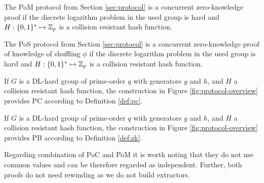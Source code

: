 \begin{lemma}\label{lem:pom2}
  The \ac{PoM} protocol from Section \ref{sec:protocol} is a concurrent zero-knowledge proof if the discrete logarithm problem in the used group \GG is hard and $H:\{0,1\}^\ast\mapsto\mathbb{Z}_p$ is a collision resistant hash function.
\end{lemma}

\begin{lemma}\label{lem:pos2}
  The \ac{PoS} protocol from Section \ref{sec:protocol} is a concurrent zero-knowledge proof of knowledge of shuffling $\phi$ if the discrete logarithm problem in the used group \GG is hard and $H:\{0,1\}^\ast\mapsto\mathbb{Z}_p$ is a collision resistant hash function.
\end{lemma}


\begin{theorem}\label{theo:pc}
  If $G$ is a DL-hard group of prime-order $q$ with generators $g$ and $h$, and $H$ a collision resistant hash function, the construction in Figure \ref{fig:protocol-overview} provides \acl{PC} according to Definition \ref{def:pc}.
\end{theorem}

%
\begin{theorem}\label{theo:zk}
  If $G$ is a DL-hard group of prime-order $q$ with generators $g$ and $h$, and $H$ a collision resistant hash function, the construction in Figure \ref{fig:protocol-overview} provides \ac{PB} according to Definition \ref{def:zk}.
\end{theorem}


\noindent
Regarding combination of \ac{PoC} and \ac{PoM} it is worth noting that they do not use common values and can be therefore regarded as independent.
Further, both proofs do not need rewinding as we do not build extractors.


